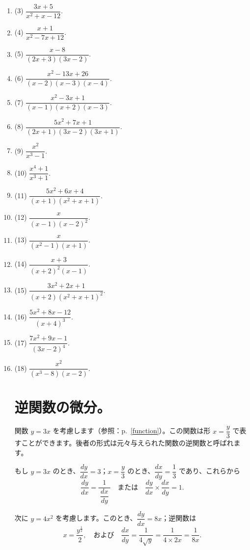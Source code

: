 \documentclass[a4paper,11pt,openany]{ltjsbook}
\newcommand{\Pageref}[2][p.]{#1~\ref{#2}}
\begin{document}
\begin{enumerate}
\item (3) \(\dfrac{3x + 5}{x^2 + x - 12}\).
\item (4) \(\dfrac{x + 1}{x^2 - 7x + 12}\).

\item (5) \(\dfrac{x - 8}{(2x + 3)(3x - 2)}\).
\item (6) \(\dfrac{x^2 - 13x + 26}{(x - 2)(x - 3)(x - 4)}\).

\item (7) \(\dfrac{x^2 - 3x + 1}{(x - 1)(x + 2)(x - 3)}\).

\item (8) \(\dfrac{5x^2 + 7x + 1}{(2x + 1)(3x - 2)(3x + 1)}\).

\item (9) \(\dfrac{x^2}{x^3 - 1}\).
\item (10) \(\dfrac{x^4 + 1}{x^3 + 1}\).

\item (11) \(\dfrac{5x^2 + 6x + 4}{(x + 1)(x^2 + x + 1)}\).
\item (12) \(\dfrac{x}{(x - 1)(x - 2)^2}\).

\item (13) \(\dfrac{x}{(x^2 - 1)(x + 1)}\).
\item (14) \(\dfrac{x + 3}{(x + 2)^2(x - 1)}\).

\item (15) \(\dfrac{3x^2 + 2x + 1}{(x + 2)(x^2 + x + 1)^2}\).
\item (16) \(\dfrac{5x^2 + 8x - 12}{(x + 4)^3}\).

\item (17) \(\dfrac{7x^2 + 9x - 1}{(3x - 2)^4}\).
\item (18) \(\dfrac{x^2}{(x^3 - 8)(x - 2)}\).

\section*{逆関数の微分。}

関数 \(y = 3x\) を考慮します（参照：\Pageref{function}）。この関数は形 \(x = \dfrac{y}{3}\) で表すことができます。後者の形式は元々与えられた関数の逆関数と呼ばれます。

もし \(y = 3x\) のとき、\(\dfrac{dy}{dx} = 3\)；\(x = \dfrac{y}{3}\) のとき、\(\dfrac{dx}{dy} = \dfrac{1}{3}\) であり、これらから
\[
\dfrac{dy}{dx} = \dfrac{1}{\ \dfrac{dx}{dy}\ }\quad \text{または}\quad
\dfrac{dy}{dx} \times  \dfrac{dx}{dy} = 1.
\]

次に \(y = 4x^2\) を考慮します。このとき、\(\dfrac{dy}{dx} = 8x\)；逆関数は
\[
x = \dfrac{y^{\frac{1}{2}}}{2},\quad \text{および}\quad
\dfrac{dx}{dy} = \dfrac{1}{4\sqrt{y}} = \dfrac{1}{4 \times  2x} = \dfrac{1}{8x}.
\]


\end{enumerate}
\end{document}
